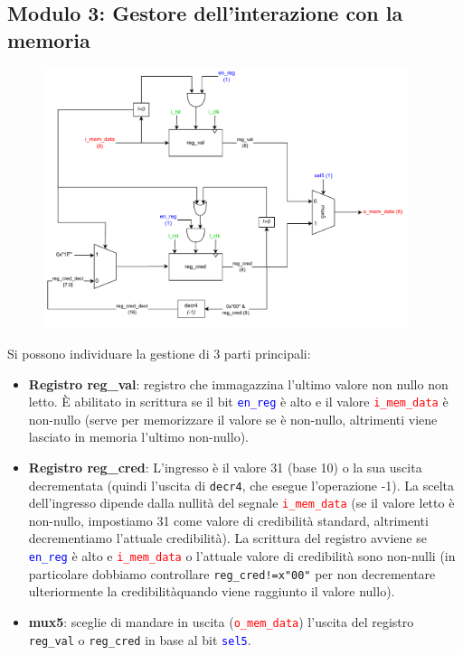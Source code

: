 \documentclass{article}
\begin{document}
\subsection{Modulo 3: Gestore dell'interazione con la memoria}

\begin{figure}[H]
  \centering
  \includegraphics[width=0.95\textwidth]{modulo3.pdf}
  \label{fig:Modulo 3: Gestore dell'interazione con la memoria}
\end{figure}

Si possono individuare la gestione di 3 parti principali:
\begin{itemize}
    \item \textbf{Registro reg\_val}: registro che immagazzina l’ultimo valore non nullo non letto. È abilitato in scrittura se il bit \texttt{\textcolor{blue}{en\_reg}} è alto e il valore \texttt{\textcolor{red}{i\_mem\_data}} è non-nullo (serve per memorizzare il valore se è non-nullo, altrimenti viene lasciato in memoria l’ultimo non-nullo).
    \item \textbf{Registro reg\_cred}: L’ingresso è il valore 31 (base 10) o la sua uscita decrementata (quindi l’uscita di \texttt{decr4}, che esegue l’operazione -1). La scelta dell’ingresso dipende dalla nullità del segnale \texttt{\textcolor{red}{i\_mem\_data}} (se il valore letto è non-nullo, impostiamo 31 come valore di credibilità standard, altrimenti decrementiamo l’attuale credibilità). La scrittura del registro avviene se \texttt{\textcolor{blue}{en\_reg}} è alto e \texttt{\textcolor{red}{i\_mem\_data}} o l’attuale valore di credibilità sono non-nulli (in particolare dobbiamo controllare \texttt{reg\_cred!=x"00"} per non decrementare ulteriormente la credibilitàquando viene raggiunto il valore nullo).
    \item \textbf{mux5}: sceglie di mandare in uscita (\texttt{\textcolor{red}{o\_mem\_data}}) l’uscita del registro \texttt{reg\_val} o \texttt{reg\_cred} in base al bit \texttt{\textcolor{blue}{sel5}}.
\end{itemize}
\end{document}
